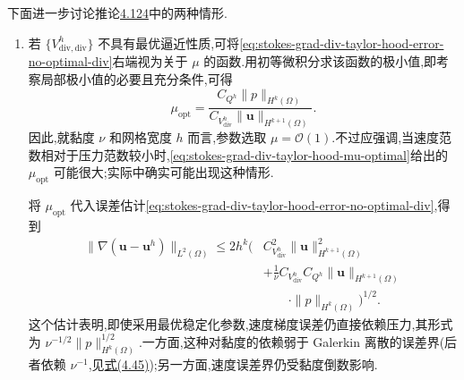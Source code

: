 \begin{note}\label{note:stokes-grad-div-error-estimate-optimality}
下面进一步讨论推论\hyperref[cor:stokes-grad-div-taylor-hood-error]{4.124}中的两种情形.
\begin{enumerate}[label=\roman*)]
  \item 若 $\{V_{\mathrm{div,div}}^h\}$ 不具有最优逼近性质,可将\cref{eq:stokes-grad-div-taylor-hood-error-no-optimal-div}右端视为关于 $\mu$ 的函数.用初等微积分求该函数的极小值,即考察局部极小值的必要且充分条件,可得
  \begin{equation}\label{eq:stokes-grad-div-taylor-hood-mu-optimal}
   \mu_{\mathrm{opt}}
   =\frac{C_{Q^h}\|p\|_{H^k(\Omega)}}
          {C_{V_{\mathrm{div}}^h}\|\bm{u}\|_{H^{k+1}(\Omega)}}.
  \end{equation}
  因此,就黏度 $\nu$ 和网格宽度 $h$ 而言,参数选取 $\mu=\mathcal{O}(1)$.不过应强调,当速度范数相对于压力范数较小时,\cref{eq:stokes-grad-div-taylor-hood-mu-optimal}给出的 $\mu_{\mathrm{opt}}$ 可能很大;实际中确实可能出现这种情形.

  将 $\mu_{\mathrm{opt}}$ 代入误差估计\cref{eq:stokes-grad-div-taylor-hood-error-no-optimal-div},得到
  \begin{equation}\label{eq:stokes-grad-div-taylor-hood-optimal-error}
   \begin{aligned}
   \|\nabla(\bm{u}-\bm{u}^h)\|_{L^2(\Omega)}
   \leq 2h^k\Biggl(&C_{V_{\mathrm{div}}^h}^2
                    \|\bm{u}\|_{H^{k+1}(\Omega)}^2\\
                  &+\frac{1}{\nu}C_{V_{\mathrm{div}}^h}C_{Q^h}
                    \|\bm{u}\|_{H^{k+1}(\Omega)}\\
                  &\qquad\cdot\|p\|_{H^k(\Omega)}\Biggr)^{1/2}.
   \end{aligned}
  \end{equation}
  这个估计表明,即使采用最优稳定化参数,速度梯度误差仍直接依赖压力,其形式为 $\nu^{-1/2}\|p\|_{H^k(\Omega)}^{1/2}$.一方面,这种对黏度的依赖弱于 Galerkin 离散的误差界(后者依赖 $\nu^{-1}$,见\hyperref[eq:stokes-scaled-error-h1]{式(4.45)});另一方面,速度误差界仍受黏度倒数影响.


\end{enumerate}
\end{note}
